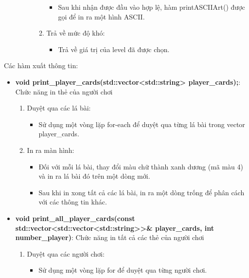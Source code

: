 \documentclass{article}
\begin{document}
\begin{itemize}
\begin{description}
\begin{enumerate}
            \begin{itemize}
                    \item Sau khi nhận được đầu vào hợp lệ, hàm printASCIIArt() được gọi để in ra một hình ASCII.
                \end{itemize}
            \item Trả về mức độ khó:
            \begin{itemize}
                    \item Trả về giá trị của level đã được chọn.
                \end{itemize}
        \end{enumerate}
    \end{description}
\end{itemize}
Các hàm xuất thông tin:
\begin{itemize}
    \item \textbf{void print\_player\_cards(std::vector<std::string> player\_cards);}: Chức năng in thẻ của người chơi
    \begin{description}
            \begin{enumerate}
            \item Duyệt qua các lá bài:
                \begin{itemize}
                    \item Sử dụng một vòng lặp for-each để duyệt qua từng lá bài trong vector player\_cards.

                \end{itemize}
            \item In ra màn hình:
                \begin{itemize}
                    \item Đối với mỗi lá bài, thay đổi màu chữ thành xanh dương (mã màu 4) và in ra lá bài đó trên một dòng mới.
                    \item Sau khi in xong tất cả các lá bài, in ra một dòng trống để phân cách với các thông tin khác.
                \end{itemize}
        \end{enumerate}
    \end{description}

    \item \textbf{void print\_all\_player\_cards(const std::vector<std::vector<std::string>>\& player\_cards, int number\_player)}: Chức năng in tất cả các thẻ của người chơi
    \begin{description}
            \begin{enumerate}
            \item Duyệt qua các người chơi:
                \begin{itemize}
                    \item Sử dụng một vòng lặp for để duyệt qua từng người chơi.


\end{itemize}
\end{enumerate}
\end{description}
\end{itemize}
\end{document}
